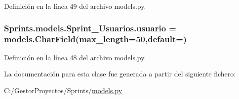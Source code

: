 Definición en la línea 49 del archivo models.\+py.

\subsubsection[{\texorpdfstring{usuario}{usuario}}]{\setlength{\rightskip}{0pt plus 5cm}Sprints.\+models.\+Sprint\+\_\+\+Usuarios.\+usuario = models.\+Char\+Field(max\+\_\+length=50,default=\textquotesingle{}\textquotesingle{})\hspace{0.3cm}{\ttfamily [static]}}\hypertarget{class_sprints_1_1models_1_1_sprint___usuarios_a729789d5d79eb2798af64656e6ff5ece}{}\label{class_sprints_1_1models_1_1_sprint___usuarios_a729789d5d79eb2798af64656e6ff5ece}


Definición en la línea 48 del archivo models.\+py.



La documentación para esta clase fue generada a partir del siguiente fichero\+:\begin{DoxyCompactItemize}
\item 
C\+:/\+Gestor\+Proyectos/\+Sprints/\hyperlink{_sprints_2models_8py}{models.\+py}\end{DoxyCompactItemize}
